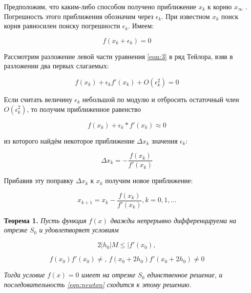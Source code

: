 \documentclass[12pt, a4paper]{article}
\begin{document}
	 Предположим, что каким-либо способом получено приближение $x_k$ к корню $x_\infty$ . Погрешность этого приближения обозначим через $\epsilon_k$. При известном $x_k$ поиск корня равносилен поиску погрешности $\epsilon_k$. Имеем: 
	 
	 \begin{equation} \label{eqn:3}
	 	f(x_k + \epsilon_k) = 0
	 \end{equation}
	 
	 Рассмотрим разложение левой части уравнения \eqref{eqn:3} в ряд Тейлора, взяв в разложении два первых слагаемых:
	 
	 \begin{equation}
		 f(x_k) + \epsilon_k f'(x_k) + O(\epsilon_k^2) = 0
	 \end{equation}
	 
	 Если считать величину $\epsilon_k$ небольшой по модулю и отбросить остаточный член $O(\epsilon_k^2)$, то получим приближенное равенство
	 
	 \begin{equation}
	 	f(x_k) + \epsilon_k * f'(x_k)\approx 0
	 \end{equation}
	 
	 из которого найдём некоторое приближение $\Delta x_k$ значения $\epsilon_k$:
	 
	 \begin{equation}
	 	\Delta x_k = - \frac{f(x_k)}{f'(x_k)}
	 \end{equation}
	 
	 Прибавив эту поправку $\Delta x_k$ к $x_k$ получим новое приближение:
	 
	 
	 \begin{equation} \label{eqn:newton}
	 	x_{k+1} = x_k - \frac{f(x_k)}{f'(x_k)}, k=0,1,\dots 
	 \end{equation}
	 
	 \textbf{Теорема 1.} \textit{Пусть функция $f(x)$ дважды непрерывно дифференцируема на отрезке $S_0$ и удовлетворяет условиям}
	 
	 \begin{equation} \label{eqn:newton1}
	 	2|h_0| M \leq |f'(x_0),
	 \end{equation}
	 
	 \begin{equation} \label{eqn:newton2}
	 	f(x_0) f'(x_0) \ne , \, f(x_0 + 2h_0) f'(x_0 + 2h_0) \ne 0
	 \end{equation}
	 
	 \textit{Тогда условие $f(x) = 0$ имеет на отрезке $S_0$ единственное решение, и последовательность \eqref{eqn:newton} сходится к этому решению.}
	 
\end{document}
